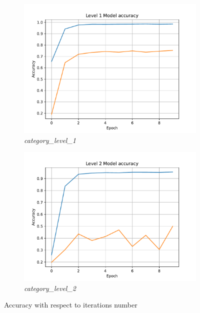\begin{figure}[htpb]
	\centering
	\begin{subfigure}{0.48\linewidth}
		\centering
		\includegraphics[width=\linewidth]{Images/level_1_epoch_accuracy.pdf}
		\caption{\textit{category\_level\_1}}
		\label{fig:level1_epochs_vs_accuracy}
	\end{subfigure}
	\begin{subfigure}{0.48\linewidth}
		\centering
		\includegraphics[width=\linewidth]{Images/level_2_epoch_accuracy.pdf}
		\caption{\textit{category\_level\_2}}
		\label{fig:level2_epochs_vs_accuracy}
	\end{subfigure}
	\caption{Accuracy with respect to iterations number}
	\label{fig:epocs_vs_accuracy}
\end{figure}
